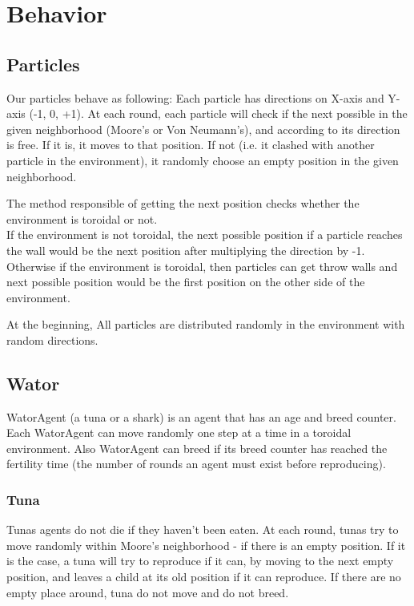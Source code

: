 \section{Behavior}
\label{sec:Behavior}
\subsection{Particles}
Our particles behave as following: Each particle has directions on X-axis and Y-axis (-1, 0, +1). At each round, each particle will check if the next possible in the given neighborhood (Moore's or Von Neumann's), and according to its direction is free. If it is, it moves to that position. If not (i.e. it clashed with another particle in the environment), it randomly choose an empty position in the given neighborhood.

The method responsible of getting the next position checks whether the environment is toroidal or not.\\
If the environment is not toroidal, the next possible position if a particle reaches the wall would be the next position after multiplying the direction by -1.\\ Otherwise if the environment is toroidal, then particles can get throw walls and next possible position would be the first position on the other side of the environment.

At the beginning, All particles are distributed randomly in the environment with random directions.

\subsection{Wator}
WatorAgent (a tuna or a shark) is an agent that has an age and breed counter.  Each WatorAgent can move randomly one step at a time in a toroidal environment. Also WatorAgent can breed if its breed counter has reached the fertility time (the number of rounds an agent must exist before reproducing).
\subsubsection{Tuna}
Tunas agents do not die if they haven't been eaten. At each round, tunas try to move randomly within Moore's neighborhood - if there is an empty position. If it is the case, a tuna will try to reproduce if it can, by moving to the next empty position, and leaves a child at its old position if it can reproduce. If there are no empty place around, tuna do not move and do not breed.
